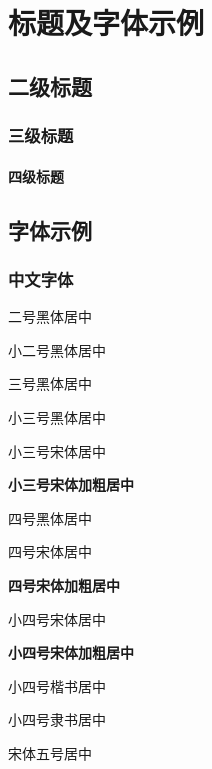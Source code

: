\chapter{标题及字体示例}

\section{二级标题}

\subsection{三级标题}

\subsubsection{四级标题}

\section{字体示例}

\subsection{中文字体}

\begin{center}

    {\heiti 二号黑体居中}

    {\heiti 小二号黑体居中}

    {\heiti 三号黑体居中}

    {
        {\heiti 小三号黑体居中}

        {\songti 小三号宋体居中}

        {\bfseries\songti 小三号宋体加粗居中}
    }

    {
        {\heiti 四号黑体居中}

        {\songti 四号宋体居中}

        {\bfseries\songti 四号宋体加粗居中}
    }
    
    {
        {\songti 小四号宋体居中}

        {\bfseries\songti 小四号宋体加粗居中}

        {\kaishu 小四号楷书居中}

        {\lishu 小四号隶书居中}
    }

    {\songti{} 宋体五号居中}

\end{center}

